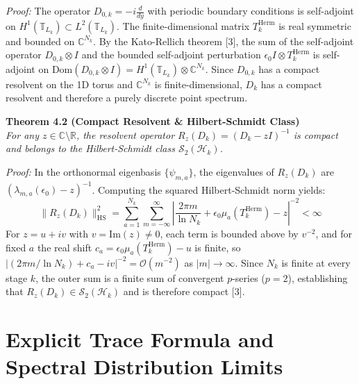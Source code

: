 \documentclass[11pt, a4paper]{article}
\begin{document}
\noindent\textit{Proof:} The operator $D_{0,k} = -i\frac{d}{dy}$ with periodic boundary conditions is self-adjoint on $H^1(\mathbb{T}_{L_k}) \subset L^2(\mathbb{T}_{L_k})$. The finite-dimensional matrix $T_k^{\mathrm{Herm}}$ is real symmetric and bounded on $\mathbb{C}^{N_k}$. By the Kato-Rellich theorem [3], the sum of the self-adjoint operator $D_{0,k} \otimes I$ and the bounded self-adjoint perturbation $\epsilon_0 I \otimes T_k^{\mathrm{Herm}}$ is self-adjoint on $\mathrm{Dom}(D_{0,k} \otimes I) = H^1(\mathbb{T}_{L_k}) \otimes \mathbb{C}^{N_k}$. Since $D_{0,k}$ has a compact resolvent on the 1D torus and $\mathbb{C}^{N_k}$ is finite-dimensional, $D_k$ has a compact resolvent and therefore a purely discrete point spectrum.

\vspace{0.5cm}
\noindent\textbf{Theorem 4.2 (Compact Resolvent \& Hilbert-Schmidt Class)}\\
\textit{For any $z \in \mathbb{C} \setminus \mathbb{R}$, the resolvent operator $R_z(D_k) = (D_k - zI)^{-1}$ is compact and belongs to the Hilbert-Schmidt class $\mathcal{S}_2(\mathcal{H}_k)$.}

\noindent\textit{Proof:} In the orthonormal eigenbasis $\{\psi_{m,a}\}$, the eigenvalues of $R_z(D_k)$ are $(\lambda_{m,a}(\epsilon_0) - z)^{-1}$. Computing the squared Hilbert-Schmidt norm yields:
\[ \|R_z(D_k)\|_{\mathrm{HS}}^2 = \sum_{a=1}^{N_k} \sum_{m=-\infty}^\infty \left| \frac{2\pi m}{\ln N_k} + \epsilon_0 \mu_a(T_k^{\mathrm{Herm}}) - z \right|^{-2} < \infty \]
For $z = u + iv$ with $v = \mathrm{Im}(z) \neq 0$, each term is bounded above by $v^{-2}$, and for fixed $a$ the real shift $c_a = \epsilon_0 \mu_a(T_k^{\mathrm{Herm}}) - u$ is finite, so $|(2\pi m / \ln N_k) + c_a - iv|^{-2} = \mathcal{O}(m^{-2})$ as $|m| \rightarrow \infty$. Since $N_k$ is finite at every stage $k$, the outer sum is a finite sum of convergent $p$-series ($p=2$), establishing that $R_z(D_k) \in \mathcal{S}_2(\mathcal{H}_k)$ and is therefore compact [3].

\section{Explicit Trace Formula and Spectral Distribution Limits}
\end{document}
